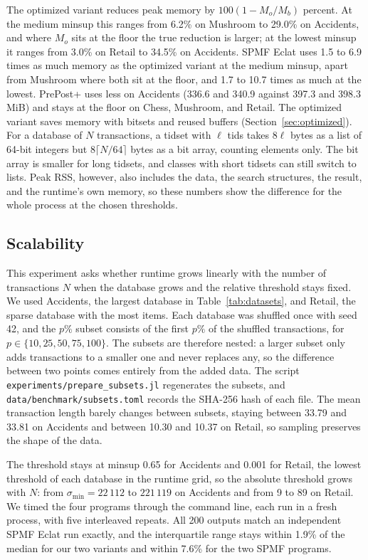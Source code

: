 The optimized variant reduces peak memory by $100(1-M_o/M_b)$ percent. At the medium
minsup this ranges from 6.2\% on Mushroom to 29.0\% on Accidents, and where $M_o$ sits at
the floor the true reduction is larger; at the lowest minsup it ranges from 3.0\% on
Retail to 34.5\% on Accidents. SPMF Eclat uses 1.5 to 6.9 times as much memory as the
optimized variant at the medium minsup, apart from Mushroom where both sit at the floor,
and 1.7 to 10.7 times as much at the lowest. PrePost+ uses less on Accidents (336.6 and
340.9 against 397.3 and 398.3\,MiB) and stays at the floor on Chess, Mushroom, and Retail. The optimized variant saves memory with
bitsets and reused buffers (Section~\ref{sec:optimized}). For a database of $N$ transactions, a tidset with $\ell$
tids takes $8\ell$ bytes as a list of 64-bit integers but $8\lceil N/64\rceil$ bytes as a
bit array, counting elements only. The bit array is smaller for long tidsets, and classes
with short tidsets can still switch to lists. Peak RSS, however, also includes the data,
the search structures, the result, and the runtime's own memory, so these numbers show
the difference for the whole process at the chosen thresholds.

\subsection{Scalability}
\label{sec:scalability}
This experiment asks whether runtime grows linearly with the number of transactions $N$
when the database grows and the relative threshold stays fixed. We used Accidents, the
largest database in Table~\ref{tab:datasets}, and Retail, the sparse database with the
most items. Each database was shuffled once with seed 42, and the $p\%$ subset consists of
the first $p\%$ of the shuffled transactions, for $p \in \{10, 25, 50, 75, 100\}$. The
subsets are therefore nested: a larger subset only adds transactions to a smaller one and
never replaces any, so the difference between two points comes entirely from the added
data. The script \texttt{experiments/prepare\_subsets.jl} regenerates the subsets, and
\texttt{data/benchmark/subsets.toml} records the SHA-256 hash of each file. The mean
transaction length barely changes between subsets, staying between 33.79 and 33.81 on
Accidents and between 10.30 and 10.37 on Retail, so sampling preserves the shape of the
data.

The threshold stays at minsup 0.65 for Accidents and 0.001 for Retail, the lowest
threshold of each database in the runtime grid, so the absolute threshold grows with $N$:
from $\sigma_{\min} = 22\,112$ to $221\,119$ on Accidents and from 9 to 89 on Retail. We
timed the four programs through the command line, each run in a fresh process, with five
interleaved repeats. All 200 outputs match an independent SPMF Eclat run exactly, and the
interquartile range stays within 1.9\% of the median for our two variants and within 7.6\%
for the two SPMF programs.

